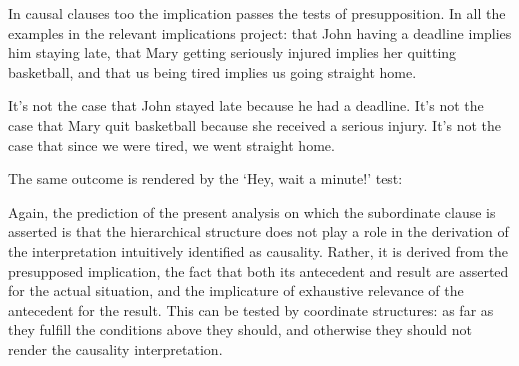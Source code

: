 \documentclass[output=paper,
colorlinks,
citecolor=brown,
newtxmath
]{langscibook}
\begin{document}
In causal clauses too the implication passes the tests of presupposition. In all the examples in  the relevant implications project: that John having a deadline implies him staying late, that Mary getting seriously injured implies her quitting basketball, and that us being tired implies us going straight home.

\largerpage[1] %

\ea\label{ex:PresupTest3}
\ea It's not the case that John stayed late because he had a deadline.\label{ex:PresupTest3-a}
\ex It's not the case that Mary quit basketball because she received a serious injury.\label{ex:PresupTest3-b}
\ex It's not the case that since we were tired, we went straight home.\label{ex:PresupTest3-c}
\z\z

\noindent The same outcome is rendered by the `Hey, wait a minute!' test:

\ea\label{ex:PresupTest4}
\ea\label{ex:PresupTest4-a}
    \begin{exe}
    \end{exe}
\ex\label{ex:PresupTest4-b}
    \begin{exe}
    \end{exe}
\ex\label{ex:PresupTest4-c}
    \begin{exe}
    \end{exe}
\z\z

\noindent Again, the prediction of the present analysis on which the subordinate clause is asserted is that the hierarchical structure does not play a role in the derivation of the interpretation intuitively identified as causality. Rather, it is derived from the presupposed implication, the fact that both its antecedent and result are asserted for the actual situation, and the implicature of exhaustive relevance of the antecedent for the result. This can be tested by coordinate structures: as far as they fulfill the conditions above they should, and otherwise they should not render the causality interpretation.
\end{document}
